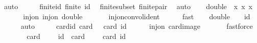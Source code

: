 \begin{isabellebody}
\ auto\isanewline
\ \ \isamarkupfalse%
\ \isamarkupfalse%
\ finite{\isacharunderscore}{\kern0pt}id{\isacharcolon}{\kern0pt}\ {\isachardoublequoteopen}finite\ {\isacharquery}{\kern0pt}id{\isachardoublequoteclose}\ \isamarkupfalse%
\ finite{\isacharunderscore}{\kern0pt}subset\ finite{\isacharunderscore}{\kern0pt}{\isasymK}{\isacharunderscore}{\kern0pt}pair\ \isamarkupfalse%
\ auto\isanewline
\isanewline
\ \ \isamarkupfalse%
\ {\isacharquery}{\kern0pt}double\ {\isacharequal}{\kern0pt}\ {\isachardoublequoteopen}{\isasymlambda}x{\isachardot}{\kern0pt}\ {\isacharparenleft}{\kern0pt}x{\isacharcomma}{\kern0pt}\ x{\isacharparenright}{\kern0pt}{\isachardoublequoteclose}\isanewline
\ \ \isanewline
\ \ \isamarkupfalse%
\ inj{\isacharunderscore}{\kern0pt}on{\isacharunderscore}{\kern0pt}{\isasymK}{\isacharcolon}{\kern0pt}\ {\isachardoublequoteopen}inj{\isacharunderscore}{\kern0pt}on\ {\isacharquery}{\kern0pt}double\ {\isasymK}{\isachardoublequoteclose}\isanewline
\ \ \ \ \isamarkupfalse%
\ inj{\isacharunderscore}{\kern0pt}on{\isacharunderscore}{\kern0pt}convol{\isacharunderscore}{\kern0pt}ident\isanewline
\ \ \ \ \isamarkupfalse%
\ fast\isanewline
\ \ \isamarkupfalse%
\ {\isachardoublequoteopen}{\isacharquery}{\kern0pt}double\ {\isacharbackquote}{\kern0pt}\ {\isasymK}\ {\isacharequal}{\kern0pt}\ {\isacharquery}{\kern0pt}id{\isachardoublequoteclose}\ \isanewline
\ \ \ \ \isamarkupfalse%
\ auto\isanewline
\ \ \isamarkupfalse%
\ \isamarkupfalse%
\ card{\isacharunderscore}{\kern0pt}id{\isacharcolon}{\kern0pt}\ {\isachardoublequoteopen}card\ {\isasymK}\ {\isacharequal}{\kern0pt}\ card\ {\isacharquery}{\kern0pt}id{\isachardoublequoteclose}\isanewline
\ \ \ \ \isamarkupfalse%
\ inj{\isacharunderscore}{\kern0pt}on{\isacharunderscore}{\kern0pt}{\isasymK}\ card{\isacharunderscore}{\kern0pt}image\ \isanewline
\ \ \ \ \isamarkupfalse%
\ fastforce\isanewline
\ \ \isanewline
\ \ \isamarkupfalse%
\ \ {\isachardoublequoteopen}card\ {\isacharparenleft}{\kern0pt}{\isacharparenleft}{\kern0pt}{\isasymK}\ {\isasymtimes}\ {\isasymK}{\isacharparenright}{\kern0pt}\ {\isacharminus}{\kern0pt}\ {\isacharquery}{\kern0pt}id{\isacharparenright}{\kern0pt}\ {\isacharequal}{\kern0pt}\ card\ {\isacharparenleft}{\kern0pt}{\isasymK}\ {\isasymtimes}\ {\isasymK}{\isacharparenright}{\kern0pt}\ {\isacharminus}{\kern0pt}\ card\ {\isacharquery}{\kern0pt}id{\isachardoublequoteclose}\isanewline

\end{isabellebody}

